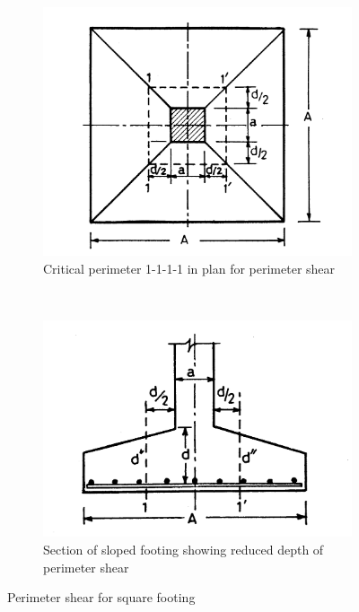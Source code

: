 \documentclass{report}
\begin{document}
\begin{figure}[h]
  \centering
  \begin{subfigure}[b]{0.5\textwidth}
    \includegraphics[width=\textwidth]{images/fig2301.png}
    \caption{Critical perimeter 1-1-1-1 in plan for perimeter shear}
    \label{fig:1}
  \end{subfigure}\\
  \begin{subfigure}[b]{0.5\textwidth}
    \includegraphics[width=\textwidth]{images/fig2302.png}
    \caption{Section of sloped footing showing reduced depth of perimeter shear}
    \label{fig:2}
  \end{subfigure}
\caption{Perimeter shear for square footing}
\end{figure}
\end{document}

